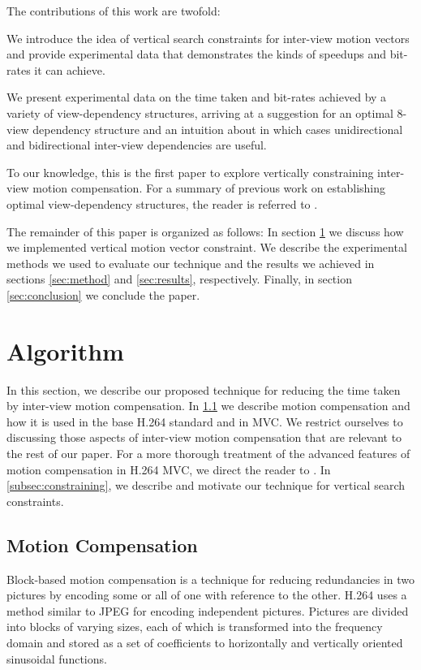 \documentclass{sig-alternate-05-2015}
\begin{document}
The contributions of this work are twofold: \begin{compactitem}
\item We introduce the idea of vertical search constraints for inter-view
motion vectors and provide experimental data that demonstrates the kinds of
speedups and bit-rates it can achieve.
\item We present experimental data on the time taken and bit-rates achieved by a
variety of view-dependency structures, arriving at a suggestion for an optimal
8-view dependency structure and an intuition about in which cases unidirectional
and bidirectional inter-view dependencies are useful. \end{compactitem} To our
knowledge, this is the first paper to explore vertically constraining inter-view
motion compensation. For a summary of previous work on establishing optimal
view-dependency structures, the reader is referred to \cite{merkle:efficient}.

The remainder of this paper is organized as follows: In section
\ref{sec:algorithm} we discuss how we implemented vertical motion vector
constraint. We describe the experimental methods we used to evaluate our
technique and the results we achieved in sections \ref{sec:method} and
\ref{sec:results}, respectively. Finally, in section \ref{sec:conclusion} we
conclude the paper.

\section{Algorithm} %
\label{sec:algorithm} %
In this section, we describe our proposed technique for reducing the time taken
by inter-view motion compensation. In \ref{subsec:background} we describe motion
compensation and how it is used in the base H.264 standard and in MVC.
We restrict ourselves to discussing those aspects of inter-view motion
compensation that are relevant to the rest of our paper. For a more thorough
treatment of the advanced features of motion compensation in H.264 MVC, we
direct the reader to \cite{vetro:overview}. In \ref{subsec:constraining}, we
describe and motivate our technique for vertical search constraints.

\subsection{Motion Compensation}
\label{subsec:background}
Block-based motion compensation is a technique for reducing redundancies in two
pictures by encoding some or all of one with reference to the other. H.264 uses
a method similar to JPEG for encoding independent pictures. Pictures are divided
into blocks of varying sizes, each of which is transformed into the frequency
domain and stored as a set of coefficients to horizontally and vertically
oriented sinusoidal functions.
\end{document}
